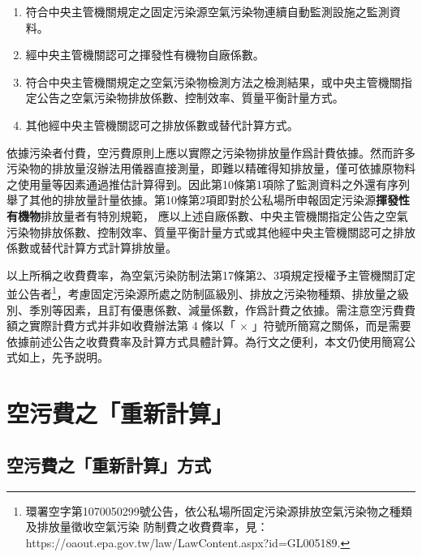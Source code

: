 \documentclass[11pt,a4paper]{article}
\begin{document}
\begin{enumerate}[itemsep=0em]
   \item 符合中央主管機關規定之固定污染源空氣污染物連續自動監測設施之監測資料。
   \item 經中央主管機關認可之揮發性有機物自廠係數。
   \item 符合中央主管機關規定之空氣污染物檢測方法之檢測結果，或中央主管機關指定公告之空氣污染物排放係數、控制效率、質量平衡計量方式。
   \item 其他經中央主管機關認可之排放係數或替代計算方式。
\end{enumerate}

依據污染者付費，空污費原則上應以實際之污染物排放量作爲計費依據。然而許多污染物的排放量沒辦法用儀器直接測量，即難以精確得知排放量，僅可依據原物料之使用量等因素通過推估計算得到。因此第10條第1項除了監測資料之外還有序列舉了其他的排放量計量依據。第10條第2項即對於公私場所申報固定污染源\textbf{揮發性有機物}排放量者有特別規範，
應以上述自廠係數、中央主管機關指定公告之空氣污染物排放係數、控制效率、質量平衡計量方式或其他經中央主管機關認可之排放係數或替代計算方式計算排放量。

以上所稱之收費費率，為空氣污染防制法第17條第2、3項規定授權予主管機關訂定並公告者\footnote{環署空字第1070050299號公告，依公私場所固定污染源排放空氣污染物之種類及排放量徵收空氣污染
防制費之收費費率，見：https://oaout.epa.gov.tw/law/LawContent.aspx?id=GL005189.}，考慮固定污染源所處之防制區級別、排放之污染物種類、排放量之級別、季別等因素，且訂有優惠係數、減量係數，作爲計費之依據。需注意空污費費額之實際計費方式并非如收費辦法第 4 條以「 $\times$ 」符號所簡寫之關係，而是需要依據前述公告之收費費率及計算方式具體計算。為行文之便利，本文仍使用簡寫公式如上，先予説明。

 
\section{空污費之「重新計算」}
\subsection{空污費之「重新計算」方式}
\end{document}
